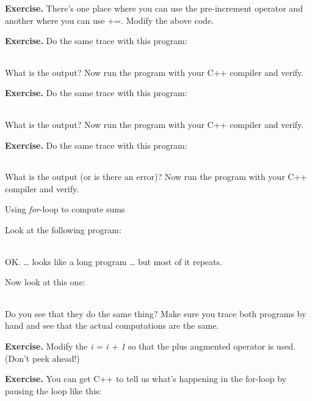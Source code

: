 \documentclass[
]{article}
\begin{document}
\textbf{Exercise. }There's one place where you can use the pre-increment
operator and another where you can use +=. Modify the above code.

\textbf{Exercise.} Do the same trace with this program:

\begin{longtable}[]{@{}@{}}
\toprule
\endhead
\bottomrule
\end{longtable}

What is the output? Now run the program with your C++ compiler and
verify.

\textbf{Exercise.} Do the same trace with this program:

\begin{longtable}[]{@{}@{}}
\toprule
\endhead
\bottomrule
\end{longtable}

What is the output? Now run the program with your C++ compiler and
verify.

\textbf{Exercise.} Do the same trace with this program:

\begin{longtable}[]{@{}@{}}
\toprule
\endhead
\bottomrule
\end{longtable}

What is the output (or is there an error)? Now run the program with your
C++ compiler and verify.

Using \emph{for}-loop to compute sums

Look at the following program:

\begin{longtable}[]{@{}@{}}
\toprule
\endhead
\bottomrule
\end{longtable}

OK. \ldots{} looks like a long program \ldots{} but most of it repeats.

Now look at this one:

\begin{longtable}[]{@{}@{}}
\toprule
\endhead
\bottomrule
\end{longtable}

Do you see that they do the same thing? Make sure you trace both
programs by hand and see that the actual computations are the same.

\textbf{Exercise.} Modify the \emph{i = i + 1} so that the plus
augmented operator is used. (Don't peek ahead!)

\textbf{Exercise.} You can get C++ to tell us what's happening in the
for-loop by pausing the loop like this:
\end{document}
